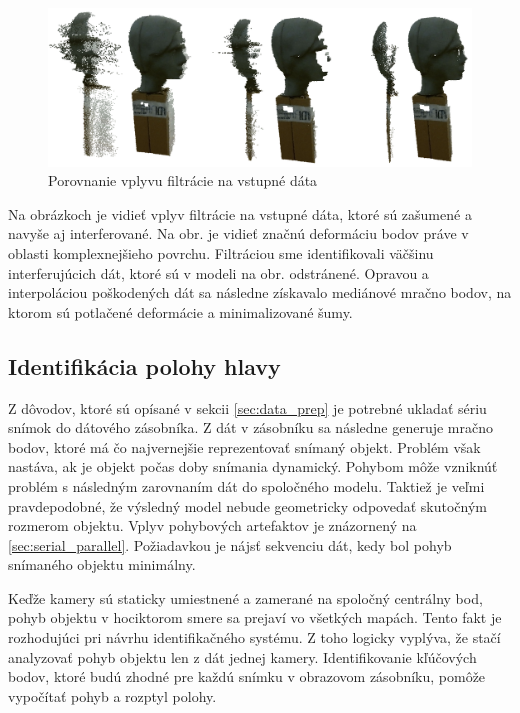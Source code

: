 \begin{figure}[H]
	\centering
	\includegraphics[width=\textwidth]{figures/prepared_models.png}
	\caption{Porovnanie vplyvu filtrácie na vstupné dáta}
	\label{fig:algorithm:result:a}
	\label{fig:algorithm:result:b}
	\label{fig:algorithm:result:c}
\end{figure}

Na obrázkoch je vidieť vplyv filtrácie na vstupné dáta, ktoré sú zašumené a navyše aj interferované. Na obr. je vidieť značnú deformáciu bodov práve v oblasti komplexnejšieho povrchu. Filtráciou sme identifikovali väčšinu interferujúcich dát, ktoré sú v modeli na obr. odstránené. Opravou a interpoláciou poškodených dát sa následne získavalo mediánové mračno bodov, na ktorom sú potlačené deformácie a minimalizované šumy. 

\subsection{Identifikácia polohy hlavy}

Z dôvodov, ktoré sú opísané v sekcii \ref{sec:data_prep} je potrebné ukladať sériu snímok do dátového zásobníka. Z dát v zásobníku sa následne generuje mračno bodov, ktoré má čo najvernejšie reprezentovať snímaný objekt. Problém však nastáva, ak je objekt počas doby snímania dynamický. Pohybom môže vzniknúť problém s následným zarovnaním dát do spoločného modelu. Taktiež je veľmi pravdepodobné, že výsledný model nebude geometricky odpovedať skutočným rozmerom objektu. Vplyv pohybových artefaktov je znázornený na \ref{sec:serial_parallel}. Požiadavkou je nájsť sekvenciu dát, kedy bol pohyb snímaného objektu minimálny. \newline 

Keďže kamery sú staticky umiestnené a zamerané na spoločný centrálny bod, pohyb objektu v hociktorom smere sa prejaví vo všetkých mapách. Tento fakt je rozhodujúci pri návrhu identifikačného systému. Z toho logicky vyplýva, že stačí analyzovať pohyb objektu len z dát jednej kamery. Identifikovanie kľúčových bodov, ktoré budú zhodné pre každú snímku v obrazovom zásobníku, pomôže vypočítať pohyb a rozptyl polohy. \newline

